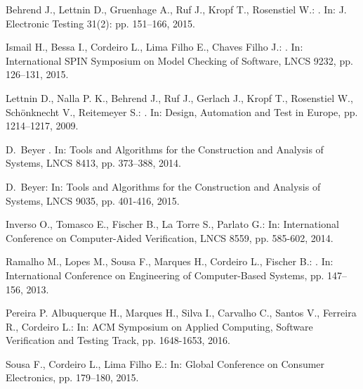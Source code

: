 \documentclass{acm_sen_article}
\begin{document}
\begin{thebibliography}{1}
Behrend J., Lettnin D., Gruenhage A., Ruf J., Kropf T., Rosenstiel W.:
. 
\newblock In: J. Electronic Testing 31(2): pp. 151--166, 2015.

Ismail H., Bessa I., Cordeiro L., Lima Filho E., Chaves Filho J.:
. 
\newblock In: International SPIN Symposium on Model Checking of Software, LNCS 9232, pp. 126--131, 2015.

Lettnin D., Nalla P. K., Behrend J., Ruf J., Gerlach J., Kropf T., Rosenstiel W., Sch{\"o}nknecht V., Reitemeyer S.:
. 
\newblock In: Design, Automation and Test in Europe, pp. 1214--1217, 2009.

D.~Beyer 
. 
\newblock In: Tools and Algorithms for the Construction and Analysis of Systems, LNCS 8413, pp. 373--388, 2014.
 
D.~Beyer:
\newblock In: Tools and Algorithms for the Construction and Analysis of Systems, LNCS 9035, pp. 401-416, 2015.

Inverso O., Tomasco E., Fischer B., La Torre S., Parlato G.:
\newblock In: International Conference on Computer-Aided Verification, LNCS 8559, pp. 585-602, 2014.

Ramalho M., Lopes M., Sousa F., Marques H., Cordeiro L., Fischer B.:
.
\newblock In: International Conference on Engineering of Computer-Based Systems, pp. 147--156, 2013.

Pereira P.  Albuquerque H., Marques H., Silva I., Carvalho C., Santos V., Ferreira R., Cordeiro L.: 
\newblock In: ACM Symposium on Applied Computing, Software Verification and Testing Track, pp. 1648-1653, 2016. 

Sousa F., Cordeiro L., Lima Filho E.: 
\newblock In: Global Conference on Consumer Electronics, pp. 179--180, 2015.


\end{thebibliography}
\end{document}
